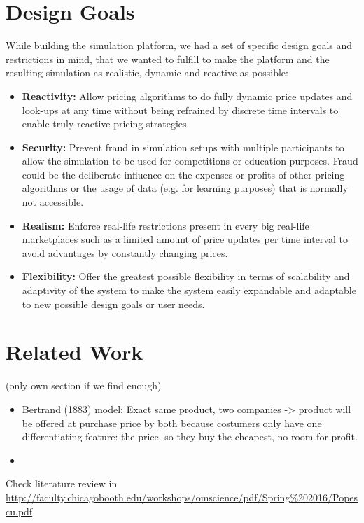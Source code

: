 \section{Design Goals}
\label{sec:Design_Goals}
%
While building the simulation platform, we had a set of specific design goals and restrictions in mind, that we wanted to fulfill to make the platform and the resulting simulation as realistic, dynamic and reactive as possible: 
\begin{itemize}
    \item \textbf{Reactivity:} Allow pricing algorithms to do fully dynamic price updates and look-ups at any time without being refrained by discrete time intervals to enable truly reactive pricing strategies.
    \item \textbf{Security:} Prevent fraud in simulation setups with multiple participants to allow the simulation to be used for competitions or education purposes. Fraud could be the deliberate influence on the expenses or profits of other pricing algorithms or the usage of data (e.g. for learning purposes) that is normally not accessible.
    \item \textbf{Realism:} Enforce real-life restrictions present in every big real-life marketplaces such as a limited amount of price updates per time interval to avoid advantages by constantly changing prices.
    \item \textbf{Flexibility:} Offer the greatest possible flexibility in terms of scalability and adaptivity of the system to make the system easily expandable and adaptable to new possible design goals or user needs. 
\end{itemize}


%
\section{Related Work}
\label{sec:Related_Work}
%
(only own section if we find enough) \\

\begin{itemize}
    \item Bertrand (1883) model: Exact same product, two companies -> product will be offered at purchase price by both because costumers only have one differentiating feature: the price. so they buy the cheapest, no room for profit.
    \item 
\end{itemize}

Check literature review in \url{http://faculty.chicagobooth.edu/workshops/omscience/pdf/Spring%202016/Popescu.pdf}